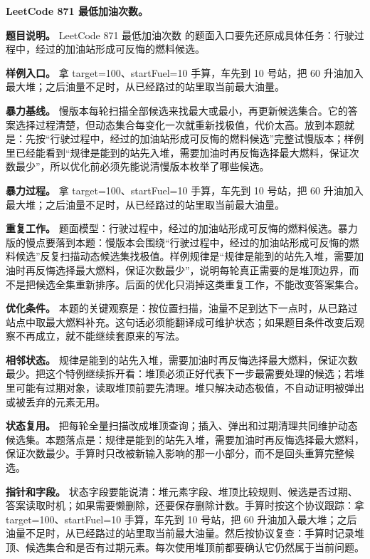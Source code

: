 \noindent\textbf{LeetCode 871 最低加油次数。}

\textbf{题目说明。} LeetCode 871 最低加油次数 的题面入口要先还原成具体任务：行驶过程中，经过的加油站形成可反悔的燃料候选。

\textbf{样例入口。} 拿 target=100、startFuel=10 手算，车先到 10 号站，把 60 升油加入最大堆；之后油量不足时，从已经路过的站里取当前最大油量。

\textbf{暴力基线。} 慢版本每轮扫描全部候选来找最大或最小，再更新候选集合。它的答案选择过程清楚，但动态集合每变化一次就重新找极值，代价太高。放到本题就是：先按“行驶过程中，经过的加油站形成可反悔的燃料候选”完整试慢版本；样例里已经能看到“规律是能到的站先入堆，需要加油时再反悔选择最大燃料，保证次数最少”，所以优化前必须先能说清慢版本枚举了哪些候选。

\textbf{暴力过程。} 拿 target=100、startFuel=10 手算，车先到 10 号站，把 60 升油加入最大堆；之后油量不足时，从已经路过的站里取当前最大油量。

\textbf{重复工作。} 题面模型：行驶过程中，经过的加油站形成可反悔的燃料候选。暴力版的慢点要落到本题：慢版本会围绕“行驶过程中，经过的加油站形成可反悔的燃料候选”反复扫描动态候选集找极值。样例规律是“规律是能到的站先入堆，需要加油时再反悔选择最大燃料，保证次数最少”，说明每轮真正需要的是堆顶边界，而不是把候选全集重新排序。后面的优化只消掉这类重复工作，不能改变答案集合。

\textbf{优化条件。} 本题的关键观察是：按位置扫描，油量不足到达下一点时，从已路过站点中取最大燃料补充。这句话必须能翻译成可维护状态；如果题目条件改变后观察不再成立，就不能继续套原来的写法。

\textbf{相邻状态。} 规律是能到的站先入堆，需要加油时再反悔选择最大燃料，保证次数最少。把这个特例继续拆开看：堆顶必须正好代表下一步最需要处理的候选；若堆里可能有过期对象，读取堆顶前要先清理。堆只解决动态极值，不自动证明被弹出或被丢弃的元素无用。

\textbf{状态复用。} 把每轮全量扫描改成堆顶查询；插入、弹出和过期清理共同维护动态候选集。本题落点是：规律是能到的站先入堆，需要加油时再反悔选择最大燃料，保证次数最少。手算时只改被新输入影响的那一小部分，而不是回头重算完整候选。

\textbf{指针和字段。} 状态字段要能说清：堆元素字段、堆顶比较规则、候选是否过期、答案读取时机；如果需要懒删除，还要保存删除计数。手算时按这个协议跟踪：拿 target=100、startFuel=10 手算，车先到 10 号站，把 60 升油加入最大堆；之后油量不足时，从已经路过的站里取当前最大油量。然后按协议复查：手算时记录堆顶、候选集合和是否有过期元素。每次使用堆顶前都要确认它仍然属于当前问题。

